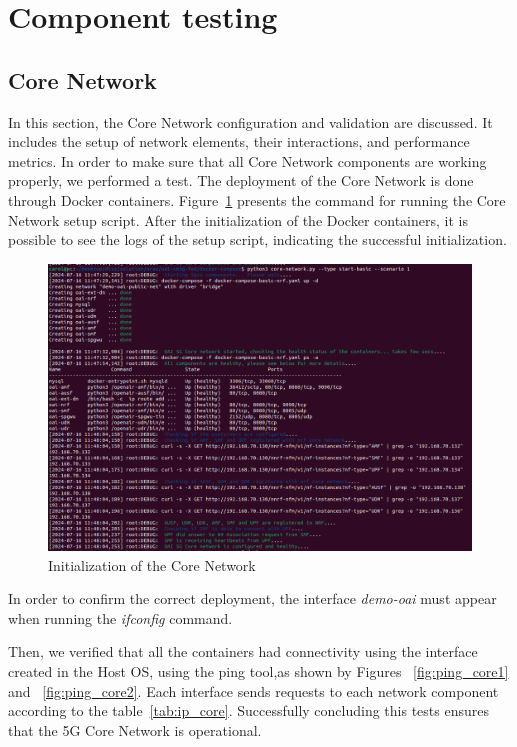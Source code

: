 \section{Component testing}\label{sec:component-testing}


\subsection{Core Network}\label{subsec:core_network}
In this section, the Core Network configuration and validation are discussed.
It includes the setup of network elements, their interactions, and performance metrics.
In order to make sure that all Core Network components are working properly, we performed a test.
The deployment of the Core Network is done through Docker containers.
Figure~\ref{fig:core_init} presents the command for running the Core Network setup script.
After the initialization of the Docker containers, it is possible to see the logs of the setup script, indicating the successful initialization.

\begin{figure}[H]
    \centering
    \includegraphics[width=0.5\linewidth]{figures/core_init}
    \caption[Initialization of the Core Network]{Initialization of the Core Network}
    \label{fig:core_init}
\end{figure}

In order to confirm the correct deployment, the interface \textit{demo-oai} must appear when running the \textit{ifconfig} command.

Then, we verified that all the containers had connectivity using the interface created in the Host OS, using the ping tool,as shown by Figures ~\ref{fig:ping_core1} and ~\ref{fig:ping_core2}.
Each interface sends requests to each network component according to the table~\ref{tab:ip_core}.
Successfully concluding this tests ensures that the 5G Core Network is operational.

